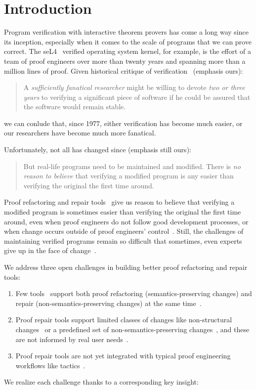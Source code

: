 \section{Introduction}

Program verification with interactive theorem provers has come a long way since its inception,
especially when it comes to the scale of programs that we can prove correct.
The seL4~\cite{Klein2009} verified operating system kernel, for example,
is the effort of a team of proof engineers over more than twenty years and spanning more than
a million lines of proof.
Given historical critique of verification~\cite{DeMillo1977} (emphasis ours):

\begin{quote}
A \textit{sufficiently fanatical researcher}
might be willing to devote \textit{two or 
three years} to verifying a significant 
piece of software if he could be 
assured that the software would remain stable.
\end{quote}
we can conlude that, since 1977, either verification has become much easier,
or our researchers have become much more fanatical.

Unfortunately, not all has changed since \citep{DeMillo1977} (emphasis still ours):

\begin{quote}
But real-life programs need to 
be maintained and modified. 
There is \textit{no reason to believe} that verifying a modified program is any 
easier than verifying the original the 
first time around.
\end{quote}
Proof refactoring and repair tools~\cite{wibergh2019, WhitesidePhD, Dietrich2013,
adams2015, Bourke12, Roe2016, robert2018, pumpkinpatch} give us reason to believe
that verifying a modified program is sometimes easier than verifying the original the first time
around, even when proof engineers do not follow good development processes,
or when change occurs outside of proof engineers' control~\cite{PGL-045}.
Still, the challenges of maintaining verified programs remain so difficult that
sometimes, even experts give up in the face of change~\cite{replica}.

We address three open challenges in building better proof refactoring and repair tools:

\begin{enumerate}
\item Few tools~\cite{robert2018, wibergh2019} support both proof refactoring (semantics-preserving changes) and repair (non-semantics-preserving changes) at the same time~\cite{PGL-045}.
\item Proof repair tools support limited classes of changes like non-structural changes~\cite{pumpkinpatch} or a predefined set
of non-semantics-preserving changes~\cite{robert2018, wibergh2019}, and these are not informed by real user needs~\cite{replica}.
\item Proof repair tools are not yet integrated with typical proof engineering workflows like tactics~\cite{PGL-045, pumpkinpatch, robert2018}.
\end{enumerate}
We realize each challenge thanks to a corresponding key insight:

